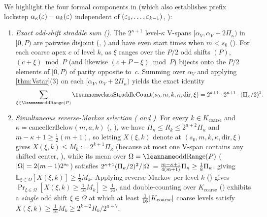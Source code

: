 \begin{outline}
We highlight the four formal components in  (which also establishes prefix lockstep
$\alpha_\kappa(\varepsilon) - \alpha_k(\varepsilon)$ independent of $(\varepsilon_1, \dots, \varepsilon_{k-1})$, ):
\begin{enumerate}
\item \emph{Exact odd-shift straddle sum ().} The $2^{\kappa+1}$ level-$\kappa$ V-spans
  $[\alpha_V, \alpha_V + 2\Pi_\kappa)$ in $[0, P)$ are pairwise disjoint (,
  ) and have even start times when $m < s_0$ (). For each coarse
  apex $c$ of level $k$, as $\xi$ ranges over the $P/2$ odd shifts $(P)$, $(c + \xi) \bmod P$ (and likewise
  $(c + P - \xi) \bmod P$) bijects onto the $P/2$ elements of $[0, P)$ of parity opposite to~$c$. Summing over $\alpha_V$
  and applying \cref{thm:Vstar}(3) on each $[\alpha_V, \alpha_V + 2\Pi_\kappa)$ yields the exact identity
  \[
    \sum_{\xi \in \lean{oddRange}(P)} \lean{classStraddleCount}(s_0, m, k, \kappa, \mathrm{dir}, \xi)
    = 2^{k+1} \cdot 2^{\kappa+1} \cdot (\Pi_\kappa / 2)^2.
  \]
\item \emph{Simultaneous reverse-Markov selection ( and ).}
  For every $k \in K_{\mathrm{coarse}}$ and $\kappa = \mathrm{cancellerBelow}(m, a, k)$ (,
  ), we have $\Pi_\kappa \le R_k \le 2^{a+2} \Pi_\kappa$ and $m - \kappa + 1 \ge \tfrac{1}{2}(m+1)$,
  so letting $X(\xi, k)$ denote  at $(s_0, m, k, \kappa, \mathrm{dir}, \xi)$ gives
  $X(\xi, k) \le M_k := 2^{k+1}\Pi_\kappa$ (because at most one V-span contains any shifted center,
  ), while its mean over $\Omega = \lean{oddRange}(P)$ ($\lvert \Omega \rvert = 2(m+1)2^{s_0}$) satisfies $2^{\kappa+1}(\Pi_\kappa/2)^2 / \lvert \Omega \rvert =
  \tfrac{m - \kappa + 1}{4(m+1)} \Pi_\kappa \ge \tfrac{1}{8}\Pi_\kappa$, giving $\mathbb{E}_{\xi \in \Omega}[X(\xi, k)] \ge
  \tfrac{1}{8} M_k$. Applying reverse Markov per level $k$ () gives $\Pr_{\xi \in \Omega}[X(\xi, k)
  \ge \tfrac{1}{16} M_k] \ge \tfrac{1}{16}$, and double-counting over $K_{\mathrm{coarse}}$ ()
  exhibits a \emph{single} odd shift $\xi \in \Omega$ at which at least $\tfrac{1}{16}\lvert K_{\mathrm{coarse}} \rvert$ coarse
  levels satisfy $X(\xi, k) \ge \tfrac{1}{16} M_k \ge 2^{k+2} R_k / 2^{a+7}$.

\end{enumerate}
\end{outline}
